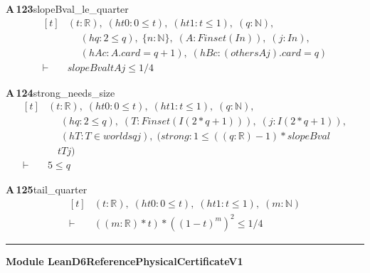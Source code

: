 \documentclass[conference]{IEEEtran}
\theoremstyle{definition}
\newcommand{\lean}[1]{\textsf{\footnotesize #1}}
\begin{document}
\noindent\textbf{A\,123}\quad\lean{slopeBval\_le\_quarter}
{\footnotesize\[ \begin{aligned}[t]
&(\mathit{t} : \mathbb{R} ),\; (\mathit{ht0} : 0 \leq \mathit{t}),\; (\mathit{ht1} : \mathit{t} \leq 1),\; (\mathit{q} : \mathbb{N} ),\\
&\quad \; (\mathit{hq} : 2 \leq \mathit{q}),\; \{ \mathit{n} : \mathbb{N} \},\; (\mathit{A} : \mathit{Finset} (\mathit{I} \mathit{n})),\; (\mathit{j} : \mathit{I} \mathit{n}),\\
&\quad \; (\mathit{hAc} : \mathit{A}.\mathit{card}=\mathit{q}+1),\; (\mathit{hBc} : (\mathit{others} \mathit{A} \mathit{j}).\mathit{card}=\mathit{q})\\
\vdash\;&\mathit{slopeBval} \mathit{t} \mathit{A} \mathit{j} \leq 1/4
\end{aligned} \]}

\noindent\textbf{A\,124}\quad\lean{strong\_needs\_size}
{\footnotesize\[ \begin{aligned}[t]
&(\mathit{t} : \mathbb{R} ),\; (\mathit{ht0} : 0 \leq \mathit{t}),\; (\mathit{ht1} : \mathit{t} \leq 1),\; (\mathit{q} : \mathbb{N} ),\\
&\quad \; (\mathit{hq} : 2 \leq \mathit{q}),\; (\mathit{T} : \mathit{Finset} (\mathit{I} (2*\mathit{q}+1))),\; (\mathit{j} : \mathit{I} (2*\mathit{q}+1)),\\
&\quad \; (\mathit{hT} : \mathit{T} \in \mathit{worlds} \mathit{q} \mathit{j}),\; (\mathit{strong} : 1 \leq ((\mathit{q}:\mathbb{R} )-1)*\mathit{slopeBval}\\
&\quad \mathit{t} \mathit{T} \mathit{j})\\
\vdash\;&5 \leq \mathit{q}
\end{aligned} \]}

\noindent\textbf{A\,125}\quad\lean{tail\_quarter}
{\footnotesize\[ \begin{aligned}[t]
&(\mathit{t} : \mathbb{R} ),\; (\mathit{ht0} : 0 \leq \mathit{t}),\; (\mathit{ht1} : \mathit{t} \leq 1),\; (\mathit{m} : \mathbb{N} )\\
\vdash\;&((\mathit{m}:\mathbb{R} )*\mathit{t})*((1-\mathit{t})^{\mathit{m}})^{2} \leq 1/4
\end{aligned} \]}

\vspace{4pt}\noindent\rule{\columnwidth}{0.4pt}\par\vspace{2pt}
\noindent\textbf{Module \lean{LeanD6ReferencePhysicalCertificateV1}}\par\vspace{3pt}
\end{document}
